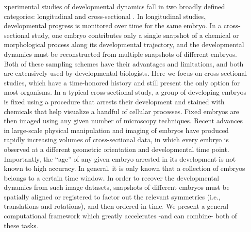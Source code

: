 \documentclass{pnastwo}
\begin{document}
\begin{article}
xperimental studies of developmental dynamics fall in two broadly defined categories: longitudinal and cross-sectional \cite{diggle2002analysis}.
%
In longitudinal studies, developmental progress is monitored over time for the same embryo.
%
In a cross-sectional study, one embryo contributes only a single snapshot of a chemical or morphological process along its developmental trajectory, and the developmental dynamics must be reconstructed from multiple snapshots of different embryos.
%
Both of these sampling schemes have their advantages and limitations, and both are extensively used by developmental biologists.
%
Here we focus on cross-sectional studies, which have a time-honored history and still present the only option for most organisms.
%
In a typical cross-sectional study, a group of developing embryos is fixed using a procedure that arrests their development and stained with chemicals that help visualize a handful of cellular processes.
%
Fixed embryos are then imaged using any given number of microscopy techniques.
%
Recent advances in large-scale physical manipulation and imaging of embryos have produced rapidly increasing volumes of cross-sectional data, in which every embryo is observed at a different geometric orientation and developmental time point.
%
Importantly, the ``age'' of any given embryo arrested in its development is not known to high accuracy.
%
In general, it is only known that a collection of embryos belongs to a certain time window.
%
In order to recover the developmental dynamics from such image datasets, snapshots of different embryos must be spatially aligned or registered to factor out the relevant symmetries (i.e., translations and rotations), and then ordered in time.
%
We present a general computational framework which greatly accelerates -and can combine- both of these tasks.


\end{article}
\end{document}
